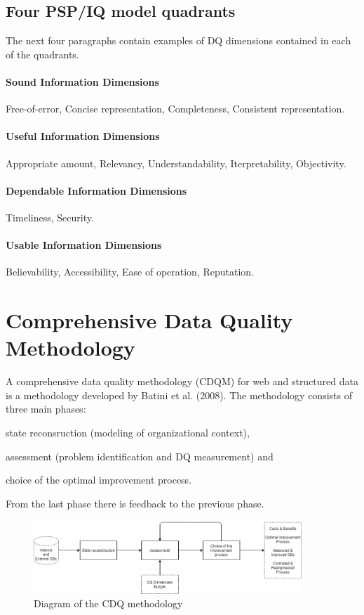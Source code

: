 \subsection{Four PSP/IQ model quadrants}

The next four paragraphs contain examples of DQ dimensions contained in each of the quadrants.

\paragraph*{Sound Information Dimensions} Free-of-error, Concise representation, Completeness, Consistent representation.
\paragraph*{Useful Information Dimensions} Appropriate amount, Relevancy, Understandability, Iterpretability, Objectivity.
\paragraph*{Dependable Information Dimensions} Timeliness, Security.
\paragraph*{Usable Information Dimensions} Believability, Accessibility, Ease of operation, Reputation.

\section{Comprehensive Data Quality Methodology}

A comprehensive data quality methodology (CDQM) for web and structured data is a methodology developed by Batini et al. (2008).
The methodology consists of three main phases: 
\begin{enumerate*}[label=(\roman*)]
    \item state reconsruction (modeling of organizational context),
    \item assessment (problem identification and DQ measurement) and
    \item choice of the optimal improvement process.
\end{enumerate*}
From the last phase there is feedback to the previous phase.

\begin{figure}[htb]
    \centering
    \includegraphics[width=0.9\textwidth]{figures/cdqm-diagram.png}
    \caption{Diagram of the CDQ methodology~\cite{batini2008}}
    \label{fig:cdqm-diagram}
\end{figure}
\FloatBarrier

